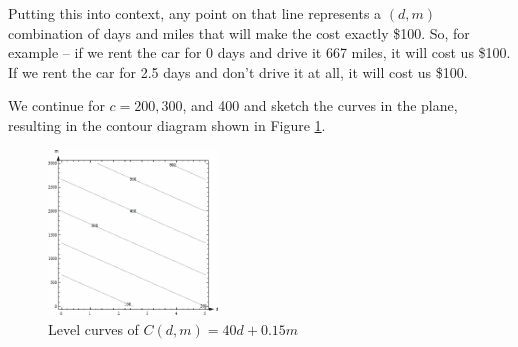 \begin{example}
\begin{solution}
Putting this into context, any point on that line represents a $(d,m)$ combination of days and miles that will make the cost exactly \$100. So, for example -- if we rent the car for 0 days and drive it 667 miles, it will cost us \$100. If we rent the car for 2.5 days and don't drive it at all, it will cost us \$100.

We continue for $c= 200, 300$, and 400 and sketch the curves in the plane, resulting in the contour diagram shown in Figure \ref{fig:4-1-contour5}.

\begin{figure}[!ht]
  \centering
    \includegraphics[width=0.4\textwidth]{img/chap4/image023.png}
    \caption{Level curves of $C(d,m) = 40d + 0.15m$}
    \label{fig:4-1-contour5}
  \end{figure}
\end{solution}\end{example}

